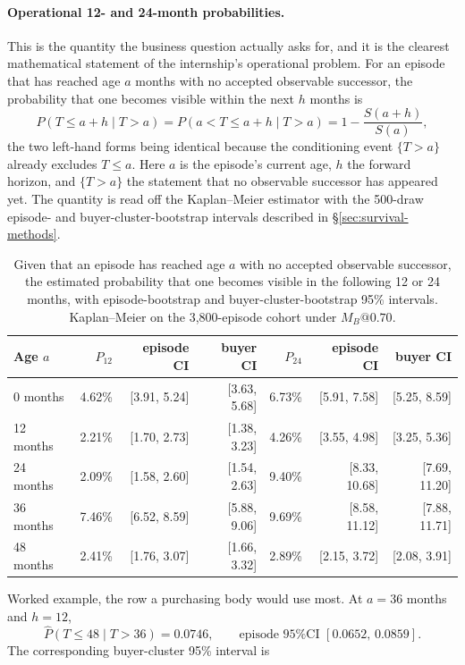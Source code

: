 \documentclass[11pt,a4paper]{article}
\begin{document}
\paragraph{Operational 12- and 24-month probabilities.} This is the quantity
the business question actually asks for, and it is the clearest mathematical
statement of the internship's operational problem. For an episode that has
reached age \(a\) months with no accepted observable successor, the probability
that one becomes visible within the next \(h\) months is
\[
P(T\le a+h \mid T>a)
= P(a<T\le a+h \mid T>a)
= 1-\frac{S(a+h)}{S(a)} ,
\]
the two left-hand forms being identical because the conditioning event
\(\{T>a\}\) already excludes \(T\le a\). Here \(a\) is the episode's current
age, \(h\) the forward horizon, and \(\{T>a\}\) the statement that no
observable successor has appeared yet. The quantity is read off the
Kaplan--Meier estimator with the 500-draw
episode- and buyer-cluster-bootstrap intervals described in \S\ref{sec:survival-methods}.
\begin{table}[H]
\centering
\small
\begin{tabularx}{\textwidth}{lrrrrrr}
\toprule
Age \(a\) & \(P_{12}\) & episode CI & buyer CI & \(P_{24}\) & episode CI & buyer CI \\
\midrule
0 months & 4.62\% & [3.91, 5.24] & [3.63, 5.68] & 6.73\% & [5.91, 7.58] & [5.25, 8.59] \\
12 months & 2.21\% & [1.70, 2.73] & [1.38, 3.23] & 4.26\% & [3.55, 4.98] & [3.25, 5.36] \\
24 months & 2.09\% & [1.58, 2.60] & [1.54, 2.63] & 9.40\% & [8.33, 10.68] & [7.69, 11.20] \\
36 months & 7.46\% & [6.52, 8.59] & [5.88, 9.06] & 9.69\% & [8.58, 11.12] & [7.88, 11.71] \\
48 months & 2.41\% & [1.76, 3.07] & [1.66, 3.32] & 2.89\% & [2.15, 3.72] & [2.08, 3.91] \\
\bottomrule
\end{tabularx}
\caption{Given that an episode has reached age \(a\) with no accepted
observable successor, the estimated probability that one becomes visible in the
following 12 or 24 months, with episode-bootstrap and buyer-cluster-bootstrap
95\% intervals. Kaplan--Meier on the
3,800-episode cohort under \(M_B@0.70\).}
\end{table}
Worked example, the row a purchasing body would use most. At
\(a=36\) months and \(h=12\),
\[
\hat{P}(T\le 48\mid T>36)=0.0746,
\qquad
\text{episode 95\% CI }[0.0652,\,
0.0859].
\]
The corresponding buyer-cluster 95\% interval is
\end{document}
